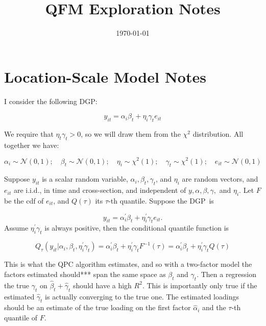 \documentclass{article}
\title{QFM Exploration Notes}
\author{}
\date{\today}
\begin{document}
\maketitle

\section{Location-Scale Model Notes}

I consider the following DGP:

\begin{equation*}
	y_{it} = \alpha_i\beta_t + \eta_i\gamma_te_{it}
\end{equation*}

We require that $\eta_t\gamma_t > 0$, so we will draw them from the $\chi^2$ distribution. All together we have:

\[
	\alpha_i \sim \mathcal{N}(0, 1); \quad \beta_t \sim \mathcal{N}(0, 1); \quad \eta_i \sim \chi^2(1); \quad \gamma_t \sim \chi^2(1); \quad e_{it} \sim \mathcal{N}(0,1)
\]


Suppose $y_{it}$ is a scalar random variable, $\alpha_{i}, \beta_t, \gamma_t$, and $\eta_i$ are random vectors, and $e_{it}$ are i.i.d., in time and cross-section, and independent of $y, \alpha, \beta, \gamma,$ and $\eta_i$. Let $F$ be the cdf of $e_{it}$, and $Q(\tau )$ its $\tau $-th quantile. Suppose the DGP\ is

%
\begin{equation*}
	y_{it}= \alpha_i^{\prime }\beta_t +\eta_i^{\prime}\gamma_te_{it}.
\end{equation*}
%
Assume $\eta_i^{\prime}\gamma_t$ is always positive, then the conditional quantile function is

%
\begin{equation*}
	Q_{\tau }(y_{it}|\alpha_i, \beta_t, \eta_i ^{\prime}\gamma_t)=\alpha_i^{\prime}\beta_t + \eta_i^{\prime}\gamma_t F^{-1}(\tau)= \alpha_i^{\prime}\beta_t + \eta_i^{\prime}\gamma_t Q(\tau)
\end{equation*}
%

This is what the QPC algorithm estimates, and so with a two-factor model the factors estimated should*** span the same space as $\beta_t$ and $\gamma_t$. Then a regression the true $\gamma_t$ on $\hat{\beta}_t + \hat{\gamma}_t$ should have a high $R^2$. This is importantly only true if the estimated $\hat{\gamma}_t$ is actually converging to the true one. The estimated loadings should be an estimate of the true loading on the first factor $\hat{\alpha}_i$ and the $\tau$-th quantile of $F$. 
\end{document}
